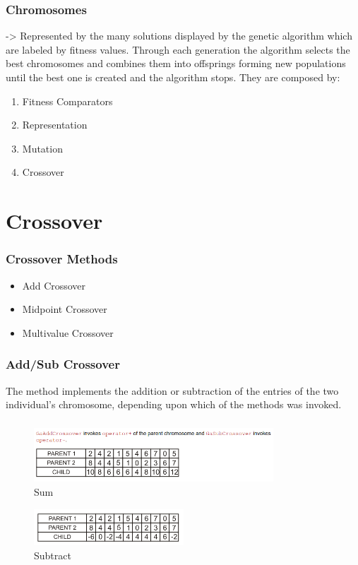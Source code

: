 \documentclass{beamer}%
\begin{document}
\begin{frame}
\frametitle{Chromosomes}
-> Represented by the many solutions displayed by the genetic
algorithm which are labeled by fitness values. Through each generation
the algorithm selects the best chromosomes and combines them into
offsprings forming new populations until the best one is created and the
algorithm stops. They are composed by: \\
\bigskip
\begin{enumerate}
\item Fitness Comparators 
\item Representation
\item Mutation
\item Crossover
\end{enumerate}

\end{frame}


\section{Crossover}


\begin{frame}
\frametitle{Crossover Methods}
\begin{itemize}
\item Add Crossover
\item Midpoint Crossover
\item Multivalue Crossover
\end{itemize}
\end{frame}


\begin{frame}
\frametitle{Add/Sub Crossover}
The method implements the addition or subtraction of the entries of the two
individual’s chromosome, depending upon which of the methods was
invoked.
\end{frame}


\begin{frame}
\frametitle{}
\begin{figure}
\centering
  \includegraphics[width=0.8\textwidth]{images/3.png}
\caption{Sum}
\end{figure}
\begin{figure}
\centering
  \includegraphics[width=0.5\textwidth]{images/4.png}
\caption{Subtract}
\end{figure}
\end{frame}
\end{document}
